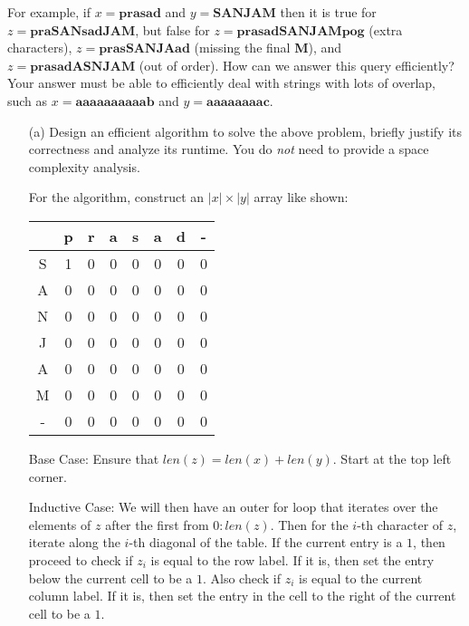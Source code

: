 \documentclass{article}
\begin{document}
For example, if $x = \textbf{prasad}$ and $y = \textbf{SANJAM}$ then it is true for $z = \textbf{praSANsadJAM}$, but false for $z = \textbf{prasadSANJAMpog}$ (extra characters), $z = \textbf{prasSANJAad}$ (missing the final \textbf{M}), and $z = \textbf{prasadASNJAM}$ (out of order). How can we answer this query efficiently? Your answer must be able to efficiently deal with strings with lots of overlap, such as $x = \textbf{aaaaaaaaaab}$ and $y = \textbf{aaaaaaaac}$.
    \begin{itemize}
        \item [(a)] Design an efficient algorithm to solve the above problem, briefly justify its correctness and analyze its runtime. You do \textit{not} need to provide a space complexity analysis.
            \begin{answer}
                For the algorithm, construct an $\lvert x \rvert \times \lvert y \rvert$ array like shown:
                    \begin{center}
                        \begin{tabular}{ c c c c c c c c }
                            \hline   & p & r & a & s & a & d & - \\
                            \hline S & 1 & 0 & 0 & 0 & 0 & 0 & 0 \\
                            \hline A & 0 & 0 & 0 & 0 & 0 & 0 & 0 \\
                            \hline N & 0 & 0 & 0 & 0 & 0 & 0 & 0 \\
                            \hline J & 0 & 0 & 0 & 0 & 0 & 0 & 0 \\
                            \hline A & 0 & 0 & 0 & 0 & 0 & 0 & 0 \\
                            \hline M & 0 & 0 & 0 & 0 & 0 & 0 & 0 \\
                            \hline - & 0 & 0 & 0 & 0 & 0 & 0 & 0   
                        \end{tabular}
                    \end{center}
                Base Case: Ensure that $len(z) = len(x) + len(y)$. Start at the top left corner.

                Inductive Case: We will then have an outer for loop that iterates over the elements of $z$ after the first from $0:len(z)$. Then for the $i$-th character of $z$, iterate along the $i$-th diagonal of the table. If the current entry is a $1$, then proceed to check if $z_{i}$ is equal to the row label. If it is, then set the entry below the current cell to be a $1$. Also check if $z_{i}$ is equal to the current column label. If it is, then set the entry in the cell to the right of the current cell to be a $1$.


\end{answer}
\end{itemize}
\end{document}
